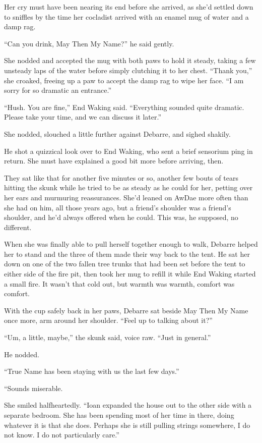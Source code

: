 Her cry must have been nearing its end before she arrived, as she'd settled down to sniffles by the time her cocladist arrived with an enamel mug of water and a damp rag.

``Can you drink, May Then My Name?'' he said gently.

She nodded and accepted the mug with both paws to hold it steady, taking a few unsteady laps of the water before simply clutching it to her chest. ``Thank you,'' she croaked, freeing up a paw to accept the damp rag to wipe her face. ``I am sorry for so dramatic an entrance.''

``Hush. You are fine,'' End Waking said. ``Everything sounded quite dramatic. Please take your time, and we can discuss it later.''

She nodded, slouched a little further against Debarre, and sighed shakily.

He shot a quizzical look over to End Waking, who sent a brief sensorium ping in return. She must have explained a good bit more before arriving, then.

They sat like that for another five minutes or so, another few bouts of tears hitting the skunk while he tried to be as steady as he could for her, petting over her ears and murmuring reassurances. She'd leaned on AwDae more often than she had on him, all those years ago, but a friend's shoulder was a friend's shoulder, and he'd always offered when he could. This was, he supposed, no different.

When she was finally able to pull herself together enough to walk, Debarre helped her to stand and the three of them made their way back to the tent. He sat her down on one of the two fallen tree trunks that had been set before the tent to either side of the fire pit, then took her mug to refill it while End Waking started a small fire. It wasn't that cold out, but warmth was warmth, comfort was comfort.

With the cup safely back in her paws, Debarre sat beside May Then My Name once more, arm around her shoulder. ``Feel up to talking about it?''

``Um, a little, maybe,'' the skunk said, voice raw. ``Just in general.''

He nodded.

``True Name has been staying with us the last few days.''

``Sounds miserable.

She smiled halfheartedly. ``Ioan expanded the house out to the other side with a separate bedroom. She has been spending most of her time in there, doing whatever it is that she does. Perhaps she is still pulling strings somewhere, I do not know. I do not particularly care.''

